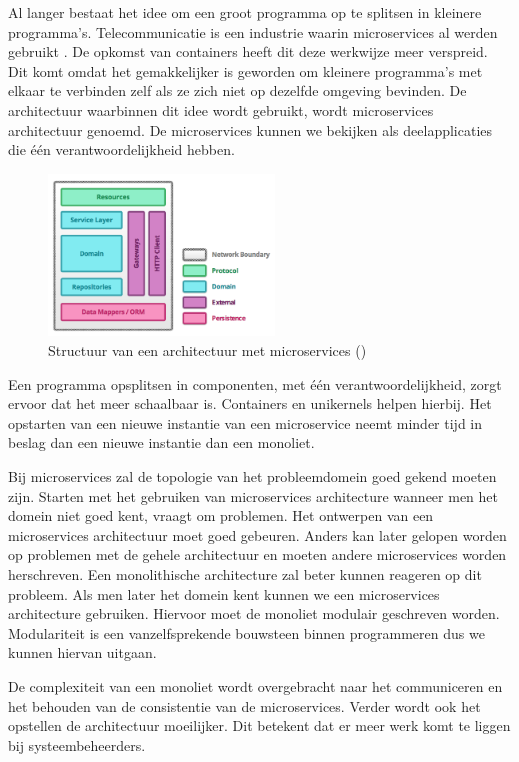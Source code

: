 \documentclass[pdftex,a4paper,12pt,twoside]{report}
\begin{document}
Al langer bestaat het idee om een groot programma op te splitsen in kleinere programma's. Telecommunicatie is een industrie waarin microservices al werden gebruikt \cite{griffin_survey_2007}. De opkomst van containers heeft dit deze werkwijze meer verspreid. Dit komt omdat het gemakkelijker is geworden om kleinere programma's met elkaar te verbinden zelf als ze zich niet op dezelfde omgeving bevinden. De architectuur waarbinnen dit idee wordt gebruikt, wordt microservices architectuur genoemd. De microservices kunnen we bekijken als deelapplicaties die één verantwoordelijkheid hebben.

\begin{figure}
    \centering
    \includegraphics[width=6cm]{img/microservice_structure_example}
    \caption{Structuur van een architectuur met microservices (\cite{toby_clemson_testing_2014}) }
    \label{fig:microservice_structure_example}
\end{figure}


Een programma opsplitsen in componenten, met één verantwoordelijkheid, zorgt ervoor dat het meer schaalbaar is. Containers en unikernels helpen hierbij. Het opstarten van een nieuwe instantie van een microservice neemt minder tijd in beslag dan een nieuwe instantie dan een monoliet.

Bij microservices zal de topologie van het probleemdomein goed gekend moeten zijn. Starten met het gebruiken van microservices architecture wanneer men het domein niet goed kent, vraagt om problemen. Het ontwerpen van een microservices architectuur moet goed gebeuren. Anders kan later gelopen worden op problemen met de gehele architectuur en moeten andere microservices worden herschreven. Een monolithische architecture zal beter kunnen reageren op dit probleem. Als men later het domein kent kunnen we een microservices architecture gebruiken. Hiervoor moet de monoliet modulair geschreven worden. Modulariteit is een vanzelfsprekende bouwsteen binnen programmeren dus we kunnen hiervan uitgaan.

De complexiteit van een monoliet wordt overgebracht naar het communiceren en het behouden van de consistentie van de microservices. Verder wordt ook het opstellen de architectuur moeilijker. Dit betekent dat er meer werk komt te liggen bij systeembeheerders.
\end{document}
